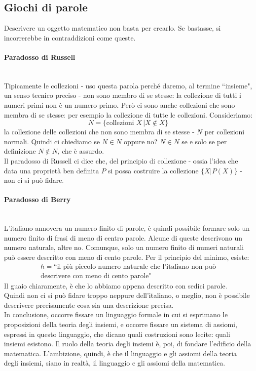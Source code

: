 \documentclass[11pt]{scrartcl}
\begin{document}
\subsection{Giochi di parole}
Descrivere un oggetto matematico non basta per crearlo. Se bastasse, si incorrerebbe in contraddizioni come queste.
\paragraph*{Paradosso di Russell}\mbox{}\\
Tipicamente le collezioni - uso questa parola perché daremo, al termine ``insieme", un senso tecnico preciso - non sono membro di se stesse: la collezione di 
tutti i numeri primi non è un numero primo. Però ci sono anche collezioni che sono membra di se stesse: per esempio la collezione di tutte le collezioni. Consideriamo:
\[ N = \{\text{collezioni $X$}\, | X \not\in X \}
	\]
la collezione delle collezioni che non sono membra di se stesse - $N$ per collezioni normali. Quindi ci chiediamo se $N \in N$ oppure no? $N \in N$ se e solo se per definizione $N \not \in N$, che è assurdo.\\
Il paradosso di Russell ci dice che, del principio di collezione - ossia l'idea che data una proprietà ben definita $P$ si possa costruire la collezione $\{X | P(X)\}$ - non ci si può fidare.

\paragraph*{Paradosso di Berry}\mbox{}\\
L'italiano annovera un numero finito di parole, è quindi possibile formare solo un numero finito di frasi di meno di centro parole. Alcune di queste descrivono un numero naturale, altre no. Comunque, solo un numero 
finito di numeri naturali può essere descritto con meno di cento parole. Per il principio del minimo, esiste:
\begin{align*}
	h = \text{``il più piccolo numero naturale che l'italiano non può} \\ 
 \text{descrivere con meno di cento parole"}
\end{align*}
Il guaio chiaramente, è che lo abbiamo appena descritto con sedici parole.\\
Quindi non ci si può fidare troppo neppure dell'italiano, o meglio, non è possibile descrivere precisamente cosa sia una descrizione precisa.\\
In conclusione, occorre fissare un linguaggio formale in cui si esprimano le proposizioni della teoria degli insiemi, e occorre fissare un sistema di assiomi, espressi in questo linguaggio, che 
dicano quali costruzioni sono lecite: quali insiemi esistono. Il ruolo della teoria degli insiemi è, poi, di fondare l'edificio della matematica. L'ambizione, quindi, è che il linguaggio e gli assiomi della teoria degli insiemi, 
siano in realtà, il linguaggio e gli assiomi della matematica.
\end{document}
